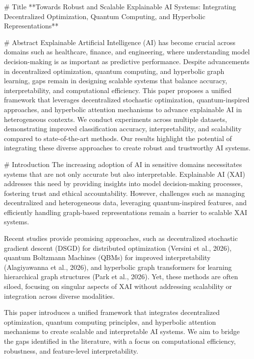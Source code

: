 # Title  
**Towards Robust and Scalable Explainable AI Systems: Integrating Decentralized Optimization, Quantum Computing, and Hyperbolic Representations**

# Abstract  
Explainable Artificial Intelligence (AI) has become crucial across domains such as healthcare, finance, and engineering, where understanding model decision-making is as important as predictive performance. Despite advancements in decentralized optimization, quantum computing, and hyperbolic graph learning, gaps remain in designing scalable systems that balance accuracy, interpretability, and computational efficiency. This paper proposes a unified framework that leverages decentralized stochastic optimization, quantum-inspired approaches, and hyperbolic attention mechanisms to advance explainable AI in heterogeneous contexts. We conduct experiments across multiple datasets, demonstrating improved classification accuracy, interpretability, and scalability compared to state-of-the-art methods. Our results highlight the potential of integrating these diverse approaches to create robust and trustworthy AI systems.  

# Introduction  
The increasing adoption of AI in sensitive domains necessitates systems that are not only accurate but also interpretable. Explainable AI (XAI) addresses this need by providing insights into model decision-making processes, fostering trust and ethical accountability. However, challenges such as managing decentralized and heterogeneous data, leveraging quantum-inspired features, and efficiently handling graph-based representations remain a barrier to scalable XAI systems.  

Recent studies provide promising approaches, such as decentralized stochastic gradient descent (DSGD) for distributed optimization (Versini et al., 2026), quantum Boltzmann Machines (QBMs) for improved interpretability (Alagiyawanna et al., 2026), and hyperbolic graph transformers for learning hierarchical graph structures (Park et al., 2026). Yet, these methods are often siloed, focusing on singular aspects of XAI without addressing scalability or integration across diverse modalities.  

This paper introduces a unified framework that integrates decentralized optimization, quantum computing principles, and hyperbolic attention mechanisms to create scalable and interpretable AI systems. We aim to bridge the gaps identified in the literature, with a focus on computational efficiency, robustness, and feature-level interpretability.  

